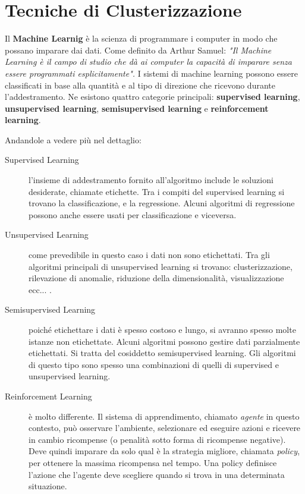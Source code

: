 \chapter{Tecniche di Clusterizzazione}

Il \textbf{Machine Learnig} è la scienza di programmare i computer in modo che possano imparare dai dati. Come definito da Arthur Samuel: \textit{"Il Machine Learning è il campo di studio che dà ai computer la capacità di imparare senza essere programmati esplicitamente".} 
I sistemi di machine learning possono essere classificati in base alla quantità e al tipo di direzione che ricevono durante l'addestramento. Ne esistono quattro categorie principali: \textbf{supervised learning},  \textbf{unsupervised learning}, \textbf{semisupervised learning} e \textbf{reinforcement learning}.

Andandole a vedere più nel dettaglio:
\begin{description}
	\item[Supervised Learning] l'insieme di addestramento fornito all'algoritmo include le soluzioni desiderate, chiamate etichette. Tra i compiti del supervised learning si trovano la classificazione, e la regressione. 
	Alcuni algoritmi di regressione possono anche essere usati per classificazione e viceversa.
	\item[Unsupervised Learning] come prevedibile in questo caso i dati non sono etichettati. Tra gli algoritmi principali di unsupervised learning si trovano: clusterizzazione, rilevazione di anomalie, riduzione della dimensionalità, visualizzazione ecc... .
	\item[Semisupervised Learning] poiché etichettare i dati è spesso costoso e lungo, si avranno spesso molte istanze non etichettate. Alcuni algoritmi possono gestire dati parzialmente etichettati. Si tratta del cosiddetto semisupervised learning. Gli algoritmi di questo tipo sono spesso una combinazioni di quelli di supervised e unsupervised learning.
	\item[Reinforcement Learning] è molto differente. 
	Il sistema di apprendimento, chiamato \textit{agente} in questo contesto, può osservare l'ambiente, selezionare ed eseguire azioni e ricevere in cambio ricompense (o penalità sotto forma di ricompense negative). Deve quindi imparare da solo qual è la strategia migliore, chiamata \textit{policy}, per ottenere la massima ricompensa nel tempo. Una policy definisce l'azione che l'agente deve scegliere quando si trova in una determinata situazione.
\end{description}


